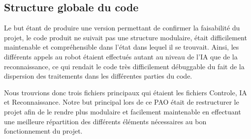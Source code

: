     \subsection{Structure globale du code}
    \par Le but étant de produire une version permettant de confirmer la faisabilité du projet, 
    le code produit ne suivait pas une structure modulaire, était difficilement maintenable et 
    compréhensible dans l'état dans lequel il se trouvait. Ainsi, les différents appels au robot 
    étaient effectués autant au niveau de l'IA que de la reconnaissance, ce qui rendait le code 
    très difficilement débuggable du fait de la dispersion des traitements dans les différentes 
    parties du code.
    
    \par Nous trouvions donc trois fichiers principaux qui étaient les fichiers Controle, IA et Reconnaissance.
    Notre but principal lors de ce PAO était de restructurer le projet afin de le rendre plus modulaire et facilement 
    maintenable en effectuant une meilleure répartition des différents éléments nécessaires au bon fonctionnement 
    du projet.

\pagebreak
